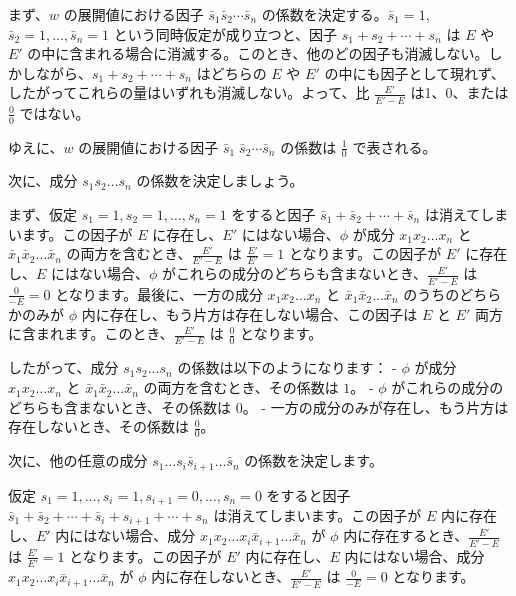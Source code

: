 \documentclass[a4paper,11pt,openany]{ltjsbook}
\begin{document}
まず、$w$ の展開値における因子 $\bar{s}_1 \bar{s}_2 \cdots \bar{s}_n$ の係数を決定する。$\bar{s}_1 = 1$, $\bar{s}_2 = 1, \dotsc, \bar{s}_n = 1$ という同時仮定が成り立つと、因子 $s_1 + s_2 + \cdots + s_n$ は $E$ や $E'$ の中に含まれる場合に消滅する。このとき、他のどの因子も消滅しない。しかしながら、$s_1 + s_2 + \cdots + s_n$ はどちらの $E$ や $E'$ の中にも因子として現れず、したがってこれらの量はいずれも消滅しない。よって、比 $\frac{E'}{E' - E}$ は1、0、または $\frac{0}{0}$ ではない。

ゆえに、$w$ の展開値における因子 $\bar{s}_1 \; \bar{s}_2 \cdots \bar{s}_n$ の係数は $\frac{1}{0}$ で表される。

次に、成分 $s_1 s_2 \dotsc s_n$ の係数を決定しましょう。

まず、仮定 $s_1 = 1, s_2 = 1, \dotsc, s_n = 1$ をすると因子 $\bar{s}_1 + \bar{s}_2 + \dotsb + \bar{s}_n$ は消えてしまいます。この因子が $E$ に存在し、$E'$ にはない場合、$\phi$ が成分 $x_1 x_2 \dotsc x_n$ と $\bar{x}_1 \bar{x}_2 \dotsc \bar{x}_n$ の両方を含むとき、$\frac{E'}{E'-E}$ は $\frac{E'}{E'} = 1$ となります。この因子が $E'$ に存在し、$E$ にはない場合、$\phi$ がこれらの成分のどちらも含まないとき、$\frac{E'}{E'-E}$ は $\frac{0}{-E} = 0$ となります。最後に、一方の成分 $x_1 x_2 \dotsc x_n$ と $\bar{x}_1 \bar{x}_2 \dotsc \bar{x}_n$ のうちのどちらかのみが $\phi$ 内に存在し、もう片方は存在しない場合、この因子は $E$ と $E'$ 両方に含まれます。このとき、$\frac{E'}{E'-E}$ は $\frac{0}{0}$ となります。

したがって、成分 $s_1 s_2 \dotsc s_n$ の係数は以下のようになります：
- $\phi$ が成分 $x_1 x_2 \dotsc x_n$ と $\bar{x}_1 \bar{x}_2 \dotsc \bar{x}_n$ の両方を含むとき、その係数は $1$。
- $\phi$ がこれらの成分のどちらも含まないとき、その係数は $0$。
- 一方の成分のみが存在し、もう片方は存在しないとき、その係数は $\frac{0}{0}$。

次に、他の任意の成分 $s_1 \dotsc s_i \bar{s}_{i+1} \dotsc \bar{s}_n$ の係数を決定します。

仮定 $s_1 = 1, \dotsc, s_i = 1, s_{i+1} = 0, \dotsc, s_n = 0$ をすると因子 $\bar{s}_1 + \bar{s}_2 + \dotsb + \bar{s}_i + s_{i+1} + \dotsb + s_n$ は消えてしまいます。この因子が $E$ 内に存在し、$E'$ 内にはない場合、成分 $x_1 x_2 \dotsc x_i \bar{x}_{i+1} \dotsc \bar{x}_n$ が $\phi$ 内に存在するとき、$\frac{E'}{E'-E}$ は $\frac{E'}{E'} = 1$ となります。この因子が $E'$ 内に存在し、$E$ 内にはない場合、成分 $x_1 x_2 \dotsc x_i \bar{x}_{i+1} \dotsc \bar{x}_n$ が $\phi$ 内に存在しないとき、$\frac{E'}{E'-E}$ は $\frac{0}{-E} = 0$ となります。
\end{document}
